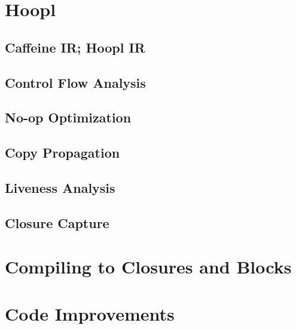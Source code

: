 \documentclass[11pt]{article}
\begin{document}
\section*{Hoopl}

\subsection*{Caffeine IR; Hoopl IR}

\subsection*{Control Flow Analysis}
\subsection*{No-op Optimization}
\subsection*{Copy Propagation}
\subsection*{Liveness Analysis}
\subsection*{Closure Capture}

\section*{Compiling to Closures and Blocks}

\section*{Code Improvements}
\end{document}
